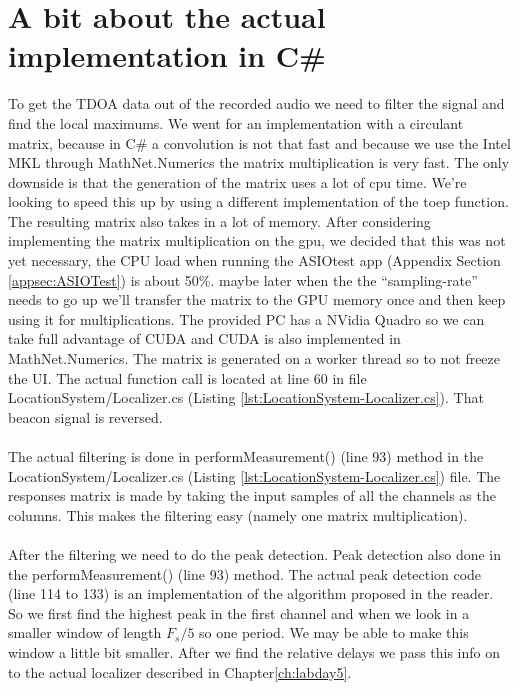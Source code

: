 \documentclass[final]{scrreprt} %
\begin{document}
\section{A bit about the actual implementation in C\#}

To get the TDOA data out of the recorded audio we need to filter the signal and find the local maximums.
We went for an implementation with a circulant matrix, because in C\# a convolution is not that fast and because we use the Intel MKL through MathNet.Numerics the matrix multiplication is very fast.
The only downside is that the generation of the matrix uses a lot of cpu time.
We're looking to speed this up by using a different implementation of the toep function.
The resulting matrix also takes in a lot of memory.
After considering implementing the matrix multiplication on the gpu, we decided that this was not yet necessary, the CPU load when running the ASIOtest app (Appendix Section \ref{appsec:ASIOTest}) is about 50\%.
maybe later when the the ``sampling-rate'' needs to go up we'll transfer the matrix to the GPU memory once and then keep using it for multiplications. The provided PC has a NVidia Quadro so we can take full advantage of CUDA and CUDA is also implemented in MathNet.Numerics.
The matrix is generated on a worker thread so to not freeze the UI.
The actual function call is located at line 60 in file LocationSystem/Localizer.cs (Listing \ref{lst:LocationSystem-Localizer.cs}).
That beacon signal is reversed.
\\ \\
The actual filtering is done in performMeasurement() (line 93) method in the LocationSystem/Localizer.cs (Listing \ref{lst:LocationSystem-Localizer.cs}) file.
The responses matrix is made by taking the input samples of all the channels as the columns. 
This makes the filtering easy (namely one matrix multiplication).
\\ \\
After the filtering we need to do the peak detection. Peak detection also done in the performMeasurement() (line 93) method.
The actual peak detection code (line 114 to 133) is an implementation of the algorithm proposed in the reader.
So we first find the highest peak in the first channel and when we look in a smaller window of length $F_s/5$ so one period.
We may be able to make this window a little bit smaller.
After we find the relative delays we pass this info on to the actual localizer described in Chapter\ref{ch:labday5}.
\end{document}
